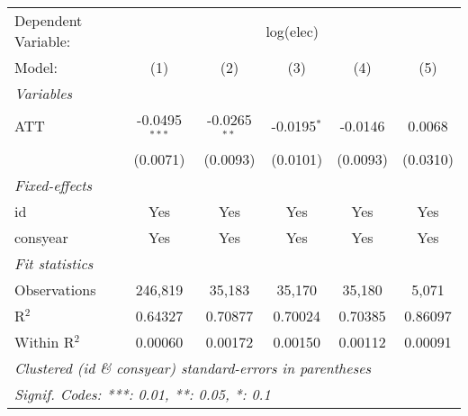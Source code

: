 
\begingroup
\centering
\begin{tabular}{lccccc}
   \tabularnewline \midrule \midrule
   Dependent Variable: & \multicolumn{5}{c}{log(elec)}\\
   Model:       & (1)             & (2)            & (3)           & (4)      & (5)\\  
   \midrule
   \emph{Variables}\\
   ATT          & -0.0495$^{***}$ & -0.0265$^{**}$ & -0.0195$^{*}$ & -0.0146  & 0.0068\\   
                & (0.0071)        & (0.0093)       & (0.0101)      & (0.0093) & (0.0310)\\   
   \midrule
   \emph{Fixed-effects}\\
   id           & Yes             & Yes            & Yes           & Yes      & Yes\\  
   consyear     & Yes             & Yes            & Yes           & Yes      & Yes\\  
   \midrule
   \emph{Fit statistics}\\
   Observations & 246,819         & 35,183         & 35,170        & 35,180   & 5,071\\  
   R$^2$        & 0.64327         & 0.70877        & 0.70024       & 0.70385  & 0.86097\\  
   Within R$^2$ & 0.00060         & 0.00172        & 0.00150       & 0.00112  & 0.00091\\  
   \midrule \midrule
   \multicolumn{6}{l}{\emph{Clustered (id \& consyear) standard-errors in parentheses}}\\
   \multicolumn{6}{l}{\emph{Signif. Codes: ***: 0.01, **: 0.05, *: 0.1}}\\
\end{tabular}
\par\endgroup


